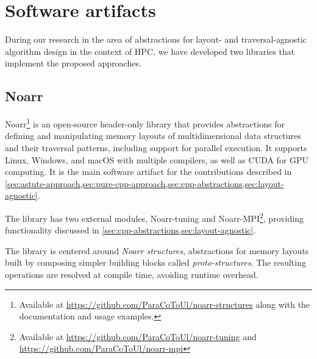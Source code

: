 \chapter{Software artifacts}\label{chap:software}

During our research in the area of abstractions for layout- and traversal-agnostic algorithm design in the context of HPC, we have developed two libraries that implement the proposed approaches.


\section{Noarr}\label{sec:sw-noarr}

Noarr\footnote{Available at \url{https://github.com/ParaCoToUl/noarr-structures} along with the documentation and usage examples.} is an open-source \cpptwenty header-only library that provides abstractions for defining and manipulating memory layouts of multidimensional data structures and their traversal patterns, including support for parallel execution.
It supports Linux, Windows, and macOS with multiple compilers, as well as CUDA for GPU computing. It is the main software artifact for the contributions described in \cref{sec:astute-approach,sec:pure-cpp-approach,sec:cpp-abstractions,sec:layout-agnostic}.


The library has two external modules, Noarr-tuning and Noarr-MPI\footnote{Available at \url{https://github.com/ParaCoToUl/noarr-tuning} and \url{https://github.com/ParaCoToUl/noarr-mpi}}, providing functionality discussed in \cref{sec:cpp-abstractions,sec:layout-agnostic}.

The library is centered around \emph{Noarr structures}, abstractions for memory layouts built by composing simpler building blocks called \emph{proto-structures}. The resulting operations are resolved at compile time, avoiding runtime overhead.

